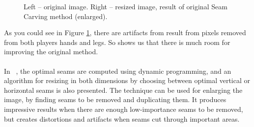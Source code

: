 \documentclass[conference]{acmsiggraph}
\begin{document}
\begin{figure}[ht]       
    \caption{Left -- original image. Right -- resized image, result of original Seam Carving method (enlarged). }
    \label{fig:orgSeamCarving}
\end{figure}


 As you could see in Figure \ref{fig:orgSeamCarving}, there are artifacts from result from pixels removed from both players hands and legs. So shows us that there is much room for improving the original method.

\paragraph{}
In  ~\cite{Avidan2007}, the optimal seams are computed using dynamic programming, and an algorithm for resizing in both dimensions by choosing between optimal vertical or horizontal seams is also presented. The technique can be used for enlarging the image, by finding seams to be removed and duplicating them. It produces impressive results when there are enough low-importance seams to be removed, but creates distortions and artifacts when seams cut through important areas.
\end{document}
